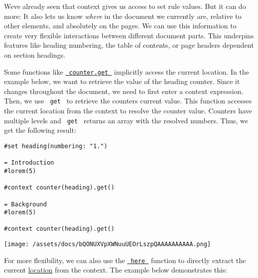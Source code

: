 We\textquotesingle ve already seen that context gives us access to set
rule values. But it can do more: It also lets us know \emph{where} in
the document we currently are, relative to other elements, and
absolutely on the pages. We can use this information to create very
flexible interactions between different document parts. This underpins
features like heading numbering, the table of contents, or page headers
dependent on section headings.

Some functions like
\href{/docs/reference/introspection/counter/\#definitions-get}{\texttt{\ counter.get\ }}
implicitly access the current location. In the example below, we want to
retrieve the value of the heading counter. Since it changes throughout
the document, we need to first enter a context expression. Then, we use
\texttt{\ get\ } to retrieve the counter\textquotesingle s current
value. This function accesses the current location from the context to
resolve the counter value. Counters have multiple levels and
\texttt{\ get\ } returns an array with the resolved numbers. Thus, we
get the following result:

\begin{verbatim}
#set heading(numbering: "1.")

= Introduction
#lorem(5)

#context counter(heading).get()

= Background
#lorem(5)

#context counter(heading).get()
\end{verbatim}

\texttt{[image: /assets/docs/bQONUXVpXWNuuUEOrLszpQAAAAAAAAAA.png]}

For more flexibility, we can also use the
\href{/docs/reference/introspection/here/}{\texttt{\ here\ }} function
to directly extract the current
\href{/docs/reference/introspection/location/}{location} from the
context. The example below demonstrates this:

